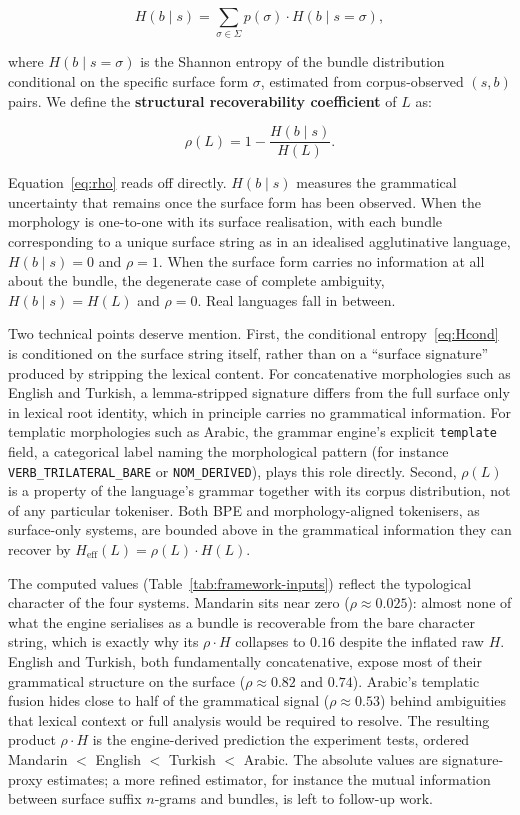 \begin{equation}
H(b \mid s) = \sum_{\sigma \in \Sigma} p(\sigma) \cdot H(b \mid s = \sigma),
\label{eq:Hcond}
\end{equation}

where $H(b \mid s = \sigma)$ is the Shannon entropy of the bundle distribution conditional on the specific surface form $\sigma$, estimated from corpus-observed $(s, b)$ pairs. We define the \textbf{structural recoverability coefficient} of $L$ as:

\begin{equation}
\rho(L) = 1 - \frac{H(b \mid s)}{H(L)}.
\label{eq:rho}
\end{equation}

Equation~\ref{eq:rho} reads off directly. $H(b \mid s)$ measures the grammatical uncertainty that remains once the surface form has been observed. When the morphology is one-to-one with its surface realisation, with each bundle corresponding to a unique surface string as in an idealised agglutinative language, $H(b \mid s) = 0$ and $\rho = 1$. When the surface form carries no information at all about the bundle, the degenerate case of complete ambiguity, $H(b \mid s) = H(L)$ and $\rho = 0$. Real languages fall in between.

Two technical points deserve mention. First, the conditional entropy~\ref{eq:Hcond} is conditioned on the surface string itself, rather than on a ``surface signature'' produced by stripping the lexical content. For concatenative morphologies such as English and Turkish, a lemma-stripped signature differs from the full surface only in lexical root identity, which in principle carries no grammatical information. For templatic morphologies such as Arabic, the grammar engine's explicit \texttt{template} field, a categorical label naming the morphological pattern (for instance \texttt{VERB\_TRILATERAL\_BARE} or \texttt{NOM\_DERIVED}), plays this role directly. Second, $\rho(L)$ is a property of the language's grammar together with its corpus distribution, not of any particular tokeniser. Both BPE and morphology-aligned tokenisers, as surface-only systems, are bounded above in the grammatical information they can recover by $H_{\mathrm{eff}}(L) = \rho(L) \cdot H(L)$.

The computed values (Table~\ref{tab:framework-inputs}) reflect the typological character of the four systems. Mandarin sits near zero ($\rho \approx 0.025$): almost none of what the engine serialises as a bundle is recoverable from the bare character string, which is exactly why its $\rho \cdot H$ collapses to $0.16$ despite the inflated raw $H$. English and Turkish, both fundamentally concatenative, expose most of their grammatical structure on the surface ($\rho \approx 0.82$ and $0.74$). Arabic's templatic fusion hides close to half of the grammatical signal ($\rho \approx 0.53$) behind ambiguities that lexical context or full analysis would be required to resolve. The resulting product $\rho \cdot H$ is the engine-derived prediction the experiment tests, ordered Mandarin $<$ English $<$ Turkish $<$ Arabic. The absolute values are signature-proxy estimates; a more refined estimator, for instance the mutual information between surface suffix $n$-grams and bundles, is left to follow-up work.

